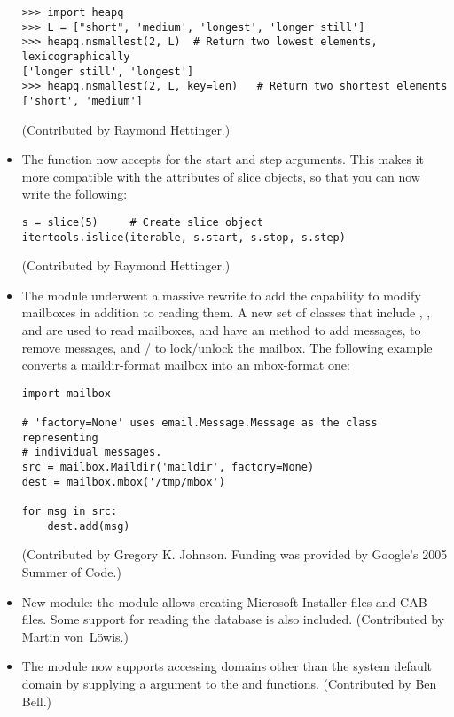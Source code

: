 \documentclass{howto}
\begin{document}
\begin{itemize}
\begin{verbatim}
>>> import heapq
>>> L = ["short", 'medium', 'longest', 'longer still']
>>> heapq.nsmallest(2, L)  # Return two lowest elements, lexicographically
['longer still', 'longest']
>>> heapq.nsmallest(2, L, key=len)   # Return two shortest elements
['short', 'medium']
\end{verbatim}

(Contributed by Raymond Hettinger.)

\item The  function now accepts
 for the start and step arguments.  This makes it more
compatible with the attributes of slice objects, so that you can now write
the following:

\begin{verbatim}
s = slice(5)     # Create slice object
itertools.islice(iterable, s.start, s.stop, s.step)
\end{verbatim}

(Contributed by Raymond Hettinger.)

\item The  module underwent a massive rewrite to add
the capability to modify mailboxes in addition to reading them.  A new
set of classes that include , , and
 are used to read mailboxes, and have an
 method to add messages,
 to remove messages, and
/ to lock/unlock the mailbox.  The
following example converts a maildir-format mailbox into an mbox-format one:

\begin{verbatim}
import mailbox

# 'factory=None' uses email.Message.Message as the class representing
# individual messages.
src = mailbox.Maildir('maildir', factory=None)
dest = mailbox.mbox('/tmp/mbox')

for msg in src:
    dest.add(msg)
\end{verbatim}

(Contributed by Gregory K. Johnson.  Funding was provided by Google's
2005 Summer of Code.)

\item New module: the  module allows creating
Microsoft Installer  files and CAB files.  Some support
for reading the  database is also included.
(Contributed by Martin von~L\"owis.)

\item The  module now supports accessing domains other
than the system default domain by supplying a  argument to
the  and  functions.
(Contributed by Ben Bell.)


\end{itemize}
\end{document}
